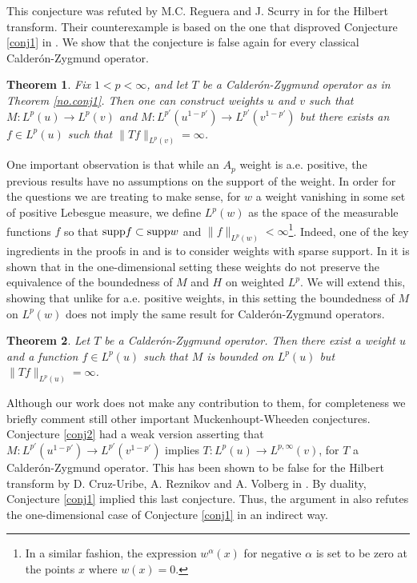 \documentclass[11pt]{amsart}
\newtheorem{teo}{Theorem}
\theoremstyle{definition}
\begin{document}
This conjecture was refuted by M.C. Reguera and J. Scurry in \cite{RegueraScurry} for the Hilbert transform. Their counterexample is based on the one that disproved Conjecture \ref{conj1} in \cite{RegueraThiele}. We show that the conjecture is false again for every classical Calder\'on-Zygmund operator.

\bigskip

\begin{teo}\label{no.conj2}
Fix $1<p<\infty$, and let $T$ be a Calder\'on-Zygmund operator as in Theorem \ref{no.conj1}. Then one can construct weights $u$ and $v$ such that $M:L^p(u)\rightarrow L^p(v)$ and $M:L^{p'}(u^{1-p'})\rightarrow L^{p'}(v^{1-p'})$ but there exists an $f\in L^p(u)$ such that $\|Tf\|_{L^p(v)}=\infty$.
\end{teo}

\bigskip

One important observation is that while an $A_p$ weight is a.e. positive, the previous results have no assumptions on the support of the weight. In order for the questions we are treating to make sense, for $w$ a weight vanishing in some set of positive Lebesgue measure, we define $L^p(w)$ as the space of the measurable functions $f$ so that ${\mathop{\mbox{\normalfont supp}}\nolimits} f\subset {\mathop{\mbox{\normalfont supp}}\nolimits} w$ and $\|f\|_{L^p(w)}<\infty$\footnote {In a similar fashion, the expression $w^\alpha(x)$ for negative $\alpha$ is set to be zero at the points $x$ where $w(x)=0$.}. Indeed, one of the key ingredients in the proofs in \cite{RegueraThiele} and \cite{RegueraScurry} is to consider weights with sparse support. In \cite{RegueraScurry} it is shown that  in the one-dimensional setting these weights do not preserve the equivalence of the boundedness of $M$ and $H$ on weighted $L^p$. We will extend this, showing that unlike for a.e. positive weights, in this setting the boundedness of $M$ on $L^p(w)$ does not imply the same result for  Calder\'on-Zygmund operators.

\bigskip

\begin{teo}\label{no.conj3} Let $T$ be a Calder\'on-Zygmund operator. Then there exist a weight $u$ and a function $f\in L^p(u)$ such that $M$ is bounded on $L^p(u)$ but $\|Tf\|_{L^p(u)}=\infty$.
\end{teo}

\bigskip

Although our work does not make any contribution to them, for completeness we briefly comment still other important Muckenhoupt-Wheeden conjectures. Conjecture \ref{conj2} had a weak version asserting that $M:L^{p'}(u^{1-p'})\rightarrow L^{p'}(v^{1-p'})$ implies $T:L^p(u)\rightarrow L^{p,\infty}(v)$, for $T$ a Calder\'on-Zygmund operator. This has been shown to be false for the Hilbert transform by D. Cruz-Uribe, A. Reznikov and A. Volberg in \cite{CURV}. By duality, Conjecture \ref{conj1} implied this last conjecture. Thus, the argument in \cite{CURV} also refutes the one-dimensional case of Conjecture \ref{conj1} in an indirect way.
\end{document}
